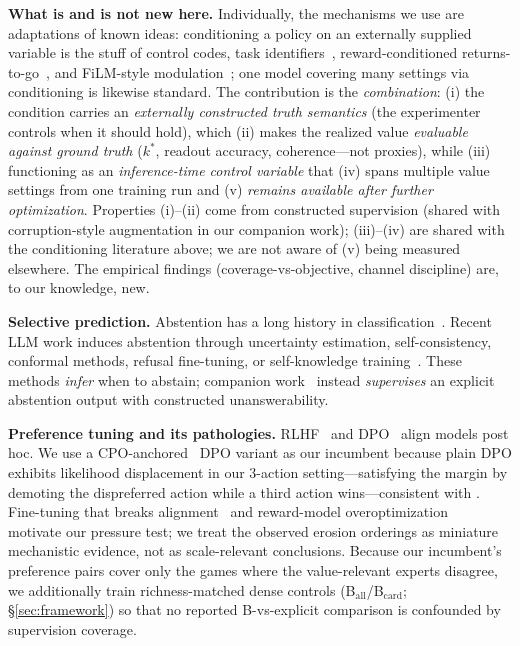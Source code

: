 \documentclass[manuscript, screen, review]{jair}
\begin{document}
\textbf{What is and is not new here.} Individually, the mechanisms we use are adaptations of known ideas: conditioning a policy on an externally supplied variable is the stuff of control codes, task identifiers~\citep{oh2017zero}, reward-conditioned returns-to-go~\citep{chen2021decision}, and FiLM-style modulation~\citep{perez2018film}; one model covering many settings via conditioning is likewise standard. The contribution is the \emph{combination}: (i) the condition carries an \emph{externally constructed truth semantics} (the experimenter controls when it should hold), which (ii) makes the realized value \emph{evaluable against ground truth} ($k^*$, readout accuracy, coherence---not proxies), while (iii) functioning as an \emph{inference-time control variable} that (iv) spans multiple value settings from one training run and (v) \emph{remains available after further optimization}. Properties (i)--(ii) come from constructed supervision (shared with corruption-style augmentation in our companion work); (iii)--(iv) are shared with the conditioning literature above; we are not aware of (v) being measured elsewhere. The empirical findings (coverage-vs-objective, channel discipline) are, to our knowledge, new.

\textbf{Selective prediction.} Abstention has a long history in classification~\citep{chow1970optimum,geifman2017selective}. Recent LLM work induces abstention through uncertainty estimation, self-consistency, conformal methods, refusal fine-tuning, or self-knowledge training~\citep{kalai2025why,kuhn2023semantic,lin2024conformal,zhang2024rtuning,kadavath2022know}. These methods \emph{infer} when to abstain; companion work~\citep{kanber2026abstain} instead \emph{supervises} an explicit abstention output with constructed unanswerability.

\textbf{Preference tuning and its pathologies.} RLHF~\citep{ouyang2022training} and DPO~\citep{rafailov2023direct} align models post hoc. We use a CPO-anchored~\citep{xu2024contrastive} DPO variant as our incumbent because plain DPO exhibits likelihood displacement in our 3-action setting---satisfying the margin by demoting the dispreferred action while a third action wins---consistent with \citet{razin2024unintentional}. Fine-tuning that breaks alignment~\citep{qi2023finetuning} and reward-model overoptimization~\citep{gao2023scaling} motivate our pressure test; we treat the observed erosion orderings as miniature mechanistic evidence, not as scale-relevant conclusions. Because our incumbent's preference pairs cover only the games where the value-relevant experts disagree, we additionally train richness-matched dense controls (B$_{\mathrm{all}}$/B$_{\mathrm{card}}$; \S\ref{sec:framework}) so that no reported B-vs-explicit comparison is confounded by supervision coverage.
\end{document}

